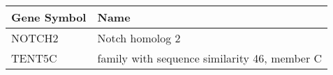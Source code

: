 \begin{tabular}{ll}
\toprule
Gene Symbol &                                         Name \\
\midrule
     NOTCH2 &                              Notch homolog 2 \\
     TENT5C & family with sequence similarity 46, member C \\
\bottomrule
\end{tabular}
